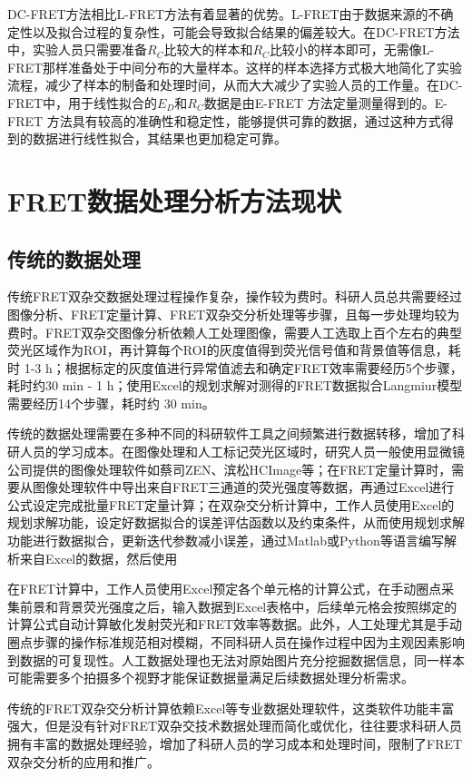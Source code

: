 DC-FRET方法相比L-FRET方法有着显著的优势。L-FRET由于数据来源的不确定性以及拟合过程的复杂性，可能会导致拟合结果的偏差较大。在DC-FRET方法中，实验人员只需要准备$R_C$比较大的样本和$R_C$比较小的样本即可，无需像L-FRET那样准备处于中间分布的大量样本。这样的样本选择方式极大地简化了实验流程，减少了样本的制备和处理时间，从而大大减少了实验人员的工作量。在DC-FRET中，用于线性拟合的$E_D$和$R_C$数据是由E-FRET 方法定量测量得到的。E-FRET 方法具有较高的准确性和稳定性，能够提供可靠的数据，通过这种方式得到的数据进行线性拟合，其结果也更加稳定可靠。
\fi

\section{FRET数据处理分析方法现状}

\subsection{传统的数据处理}

\ifshowtext
传统FRET双杂交数据处理过程操作复杂，操作较为费时。科研人员总共需要经过图像分析、FRET定量计算、FRET双杂交分析处理等步骤，且每一步处理均较为费时。FRET双杂交图像分析依赖人工处理图像，需要人工选取上百个左右的典型荧光区域作为ROI，再计算每个ROI的灰度值得到荧光信号值和背景值等信息，耗时 1-3 h；根据标定的灰度值进行异常值滤去和确定FRET效率需要经历5个步骤，耗时约30 min - 1 h；使用Excel的规划求解对测得的FRET数据拟合Langmiur模型需要经历14个步骤，耗时约 30 min。

传统的数据处理需要在多种不同的科研软件工具之间频繁进行数据转移，增加了科研人员的学习成本。在图像处理和人工标记荧光区域时，研究人员一般使用显微镜公司提供的图像处理软件如蔡司ZEN、滨松HCImage等；在FRET定量计算时，需要从图像处理软件中导出来自FRET三通道的荧光强度等数据，再通过Excel进行公式设定完成批量FRET定量计算；在双杂交分析计算中，工作人员使用Excel的规划求解功能，设定好数据拟合的误差评估函数以及约束条件，从而使用规划求解功能进行数据拟合，更新迭代参数减小误差，通过Matlab或Python等语言编写解析来自Excel的数据，然后使用

在FRET计算中，工作人员使用Excel预定各个单元格的计算公式，在手动圈点采集前景和背景荧光强度之后，输入数据到Excel表格中，后续单元格会按照绑定的计算公式自动计算敏化发射荧光和FRET效率等数据。此外，人工处理尤其是手动圈点步骤的操作标准规范相对模糊，不同科研人员在操作过程中因为主观因素影响到数据的可复现性。人工数据处理也无法对原始图片充分挖掘数据信息，同一样本可能需要多个拍摄多个视野才能保证数据量满足后续数据处理分析需求。

传统的FRET双杂交分析计算依赖Excel等专业数据处理软件，这类软件功能丰富强大，但是没有针对FRET双杂交技术数据处理而简化或优化，往往要求科研人员拥有丰富的数据处理经验，增加了科研人员的学习成本和处理时间，限制了FRET双杂交分析的应用和推广。
\fi

